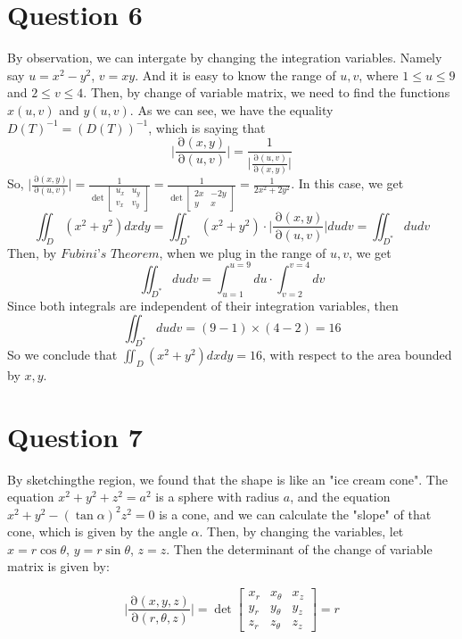 \documentclass[12pt]{article}
\DeclareMathOperator{\pt}{\partial}
\begin{document}
\section*{Question 6}
By observation, we can intergate by changing the integration
variables. Namely say $ u = x^2 - y^2 $, $v = xy$.
And it is easy to know the range of $u,v$, where
$ 1 \leq u \leq 9$ and $2 \leq v \leq 4$. Then, by
change of variable matrix, we need to find the 
functions $x(u,v)$ and $y(u,v)$. As we can see, we have the
equality $\displaystyle{D(T)^{-1} = (D(T))^{-1}}$, 
which is saying that
\[ \Bigg| \frac{\pt(x,y)}{\pt(u,v)}\Bigg| = 
\frac{1}{\Bigg|\displaystyle{\frac{\pt(u,v)}{\pt(x,y)}\Bigg|}}\]
So, $\displaystyle{\Bigg| \frac{\pt(x,y)}{\pt(u,v)} \Bigg|}
= \frac{1}{ \det
\begin{bmatrix}
u_x & u_y \\
v_x & v_y
\end{bmatrix}} = 
\frac{1}{ \det
    \begin{bmatrix}
        2x & -2y \\
        y & x
    \end{bmatrix}}
= \displaystyle{\frac{1}{2x^2 + 2y^2}}$. In this case,
we get
\[ \iint_D \left( x^2 + y^2 \right) dxdy 
= \iint_{D^*} \left( x^2 + y^2 \right) \cdot
\Bigg| \frac{\pt(x,y)}{\pt(u,v)} \Bigg| dudv
= \iint_{D^*}  dudv\]
Then, by $\textit{Fubini's Theorem}$, when we
plug in the range of $u,v$, we get
\[ \iint_{D^*} dudv = \int_{u=1}^{u=9}du \cdot
\int_{v=2}^{v=4} dv \]
Since both integrals are independent of their 
integration variables, then
\[ \iint_{D^*} dudv = (9-1)\times(4-2) = 16 \]
So we conclude that $\displaystyle{
    \iint_{D}\left(x^2 + y^2\right)dxdy = 16
}$, with respect to the area bounded by $x,y$.


\newpage
\section*{Question 7}

By sketchingthe region, we found that the shape is
like an "ice cream cone". The equation
$x^2 + y^2 + z^2 = a^2$ is a sphere with radius $a$,
and the equation $x^2 + y^2 - (\tan \alpha)^2 z^2 = 0$
is a cone, and we can calculate the "slope" of that cone,
which is given by the angle $\alpha$. Then, by changing
the variables, let $x = r\cos \theta$, $
y = r \sin \theta $, $z = z$. Then the 
determinant of the change of
variable matrix is given by:

\[ \Bigg| \frac{\pt(x,y,z)}{\pt(r,\theta,z)} \Bigg| 
= \det
\begin{bmatrix}
    x_r & x_{\theta} & x_z \\
    y_r & y_{\theta} & y_z \\
    z_r & z_{\theta} & z_z
\end{bmatrix} = r\]
\end{document}
